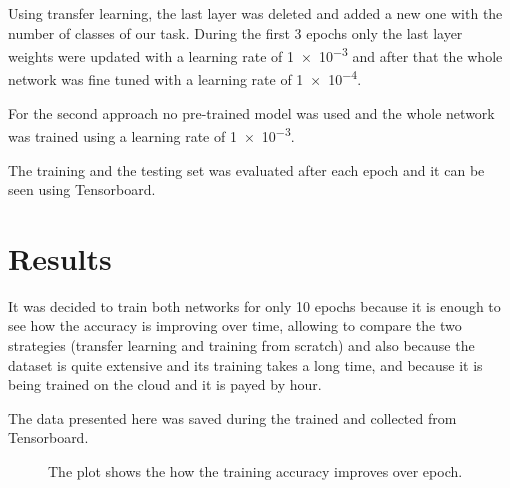 \documentclass{article}
\begin{document}
Using transfer learning, the last layer was deleted and added a new one with the number of classes of our task. During the first 3 epochs only the last layer weights were updated with a learning rate of \num{1e-3} and after that the whole network was fine tuned with a learning rate of \num{1e-4}.

For the second approach no pre-trained model was used and the whole network was trained using a learning rate of \num{1e-3}.

The training and the testing set was evaluated after each epoch and it can be seen using Tensorboard.


\section{Results}

It was decided to train both networks for only 10 epochs because it is enough to see how the accuracy is improving over time, allowing to compare the two strategies (transfer learning and training from scratch) and also because the dataset is quite extensive and its training takes a long time, and because it is being trained on the cloud and it is payed by hour.

The data presented here was saved during the trained and collected from Tensorboard.


\begin{figure}
    \centering
    \caption{The plot shows the how the training accuracy improves over epoch.}
    \label{fig:training-accuracy}
\end{figure}
\end{document}
